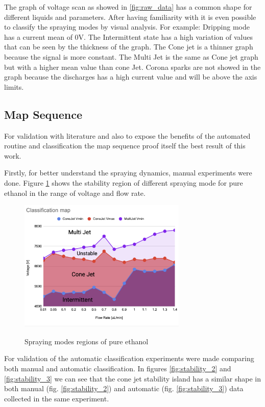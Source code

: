The graph of voltage scan as showed in \ref{fig:raw_data} has a common shape for different liquids and parameters. After having familiarity with it is even possible to classify the spraying modes by visual analysis. For example: 
Dripping mode has a current mean of 0V. The Intermittent state has a high variation of values that can be seen by the thickness of the graph. The Cone jet is a thinner graph because the signal is more constant. The Multi Jet is the same as Cone jet graph but with a higher mean value than cone Jet. Corona sparks are not showed in the graph because the discharges has a high current value and will be above the axis limits.



\subsection{Map Sequence}
\label{subsec:map_results}

For validation with literature and also to expose the benefits of the automated routine and classification the map sequence proof itself the best result of this work.



    Firstly, for better understand the spraying dynamics, manual experiments were done.
    Figure \ref{fig:stability_1} shows the stability region of different spraying mode for pure ethanol in the range of voltage and flow rate.

    \begin{figure}[H]
        \center
        \includegraphics[width=8cm]{Figuras/regions.png}
        \label{fig:stability_1}
        \caption{Spraying modes regions of pure ethanol}
    \end{figure}


    For validation of the automatic classification experiments were made comparing both manual and automatic classification.
    In figures \ref{fig:stability_2} and \ref{fig:stability_3} we can see that the cone jet stability island has a similar shape in both manual (fig. \ref{fig:stability_2}) and automatic (fig. \ref{fig:stability_3}) data collected in the same experiment.

